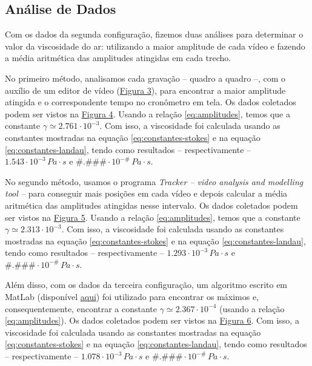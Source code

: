 \documentclass[a4paper, 12pt]{article}
\begin{document}
\begin{multicols}{2}
		\section{Análise de Dados} \label{sec:analise}
			\par Com os dados da segunda configuração, fizemos duas análises para determinar o valor da viscosidade do ar: utilizando a maior amplitude de cada vídeo e fazendo a média aritmética das amplitudes atingidas em cada trecho.
			\par No primeiro método, analisamos cada gravação -- quadro a quadro --, com o auxílio de um editor de vídeo (\hyperref[img:quadros]{Figura 3}), para encontrar a maior amplitude atingida e o correspondente tempo no cronômetro em tela. Os dados coletados podem ser vistos na \hyperref[img:m1]{Figura 4}. Usando a relação \hyperref[eq:amplitudes]{\ref{eq:amplitudes}}, temos que a constante $\gamma \simeq 2.761 \cdot 10^{-3}$. Com isso, a viscosidade foi calculada usando as constantes mostradas na equação \hyperref[eq:constantes-stokes]{\ref{eq:constantes-stokes}} e na equação \hyperref[eq:constantes-landau]{\ref{eq:constantes-landau}}, tendo como resultados -- respectivamente -- $1.543 \cdot 10^{-3} \, Pa \cdot s$ e $\#.\#\#\# \cdot 10^{-\#} \, Pa \cdot s$.
			\par No segundo método, usamos o programa \textit{Tracker -- video analysis and modelling tool --} para conseguir mais posições em cada vídeo e depois calcular a média aritmética das amplitudes atingidas nesse intervalo. Os dados coletados podem ser vistos na \hyperref[img:m2]{Figura 5}. Usando a relação \hyperref[eq:amplitudes]{\ref{eq:amplitudes}}, temos que a constante $\gamma \simeq 2.313 \cdot 10^{-3}$. Com isso, a viscosidade foi calculada usando as constantes mostradas na equação \hyperref[eq:constantes-stokes]{\ref{eq:constantes-stokes}} e na equação \hyperref[eq:constantes-landau]{\ref{eq:constantes-landau}}, tendo como resultados -- respectivamente -- $1.293 \cdot 10^{-3} \, Pa \cdot s$ e $\#.\#\#\# \cdot 10^{-\#} \, Pa \cdot s$.
			\par Além disso, com os dados da terceira configuração, um algoritmo escrito em MatLab (disponível \href{https://github.com/hugoalkimim/ViscosidadeDoAr/tree/master/Algoritmo}{aqui}) foi utilizado para encontrar os máximos e, consequentemente, encontrar a constante $\gamma \simeq 2.367 \cdot 10^{-4}$ (usando a relação \hyperref[eq:amplitudes]{\ref{eq:amplitudes}}). Os dados coletados podem ser vistos na \hyperref[img:m3]{Figura 6}. Com isso, a viscosidade foi calculada usando as constantes mostradas na equação \hyperref[eq:constantes-stokes]{\ref{eq:constantes-stokes}} e na equação \hyperref[eq:constantes-landau]{\ref{eq:constantes-landau}}, tendo como resultados -- respectivamente -- $1.078 \cdot 10^{-3} \, Pa \cdot s$ e $\#.\#\#\# \cdot 10^{-\#} \, Pa \cdot s$.

\end{multicols}
\end{document}
